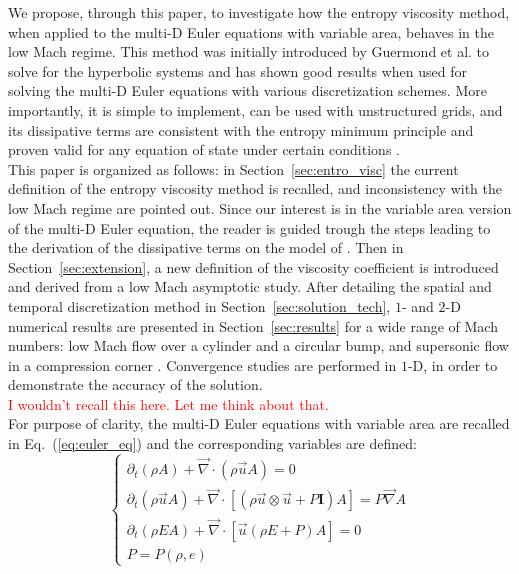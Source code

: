 \documentclass[preprint,10pt]{elsarticle}
\renewcommand{\div}{\vec{\nabla}\! \cdot \!}
\newcommand{\grad}{\vec{\nabla}}
\newcommand{\eqt}[1]{Eq.~(\ref{#1})}                     %
\newcommand{\sct}[1]{Section~\ref{#1}}                   %
\newcommand{\tcr}[1]{\textcolor{red}{#1}}
\begin{document}
We propose, through this paper, to investigate how the entropy viscosity method, when applied to the multi-D Euler equations with variable area, behaves in the low Mach regime. This method was initially introduced by Guermond et al. to solve for the hyperbolic systems and has shown good results when used for solving the multi-D Euler equations with various discretization schemes. More importantly, it is simple to implement, can be used with unstructured grids,  and its dissipative terms are consistent with the entropy minimum principle and proven valid for any equation of state under certain conditions \cite{jlg}. \\
This paper is organized as follows: in \sct{sec:entro_visc} the current definition of the entropy viscosity method is recalled, and inconsistency with the low Mach regime are pointed out. Since our interest is in the variable area version of the multi-D Euler equation, the reader is guided trough the steps leading to the derivation of the dissipative terms on the model of \cite{jlg}. Then in \sct{sec:extension}, a new definition of the viscosity coefficient is introduced and derived from a low Mach asymptotic study. After detailing the spatial and temporal discretization method in \sct{sec:solution_tech}, $1$- and $2$-D numerical results are presented in \sct{sec:results} for a wide range of Mach numbers: low Mach flow over a cylinder and a circular bump, and supersonic flow in a compression corner \cite{CompressionCorner}. Convergence studies are performed in $1$-D, in order to demonstrate the accuracy of the solution. \\
\tcr{I wouldn't recall this here. Let me think about that.}\\
For purpose of clarity, the multi-D Euler equations with variable area are recalled in \eqt{eq:euler_eq} and the corresponding variables are defined:
\begin{equation}
\label{eq:euler_eq}
\left\{ 
\begin{array}{lll}
\partial_t \left( \rho A\right) + \div \left( \rho \vec{u} A\right) = 0\\
\partial_t \left( \rho \vec{u} A\right) + \div \left[ \left( \rho \vec{u} \otimes \vec{u} + P \mathbf{I} \right) A \right] = P \grad A\\
\partial_t \left( \rho E A\right) + \div \left[ \vec{u} \left( \rho E + P \right) A\right] = 0 \\
P = P\left( \rho, e \right)
\end{array}
\right.
\end{equation}
\end{document}
